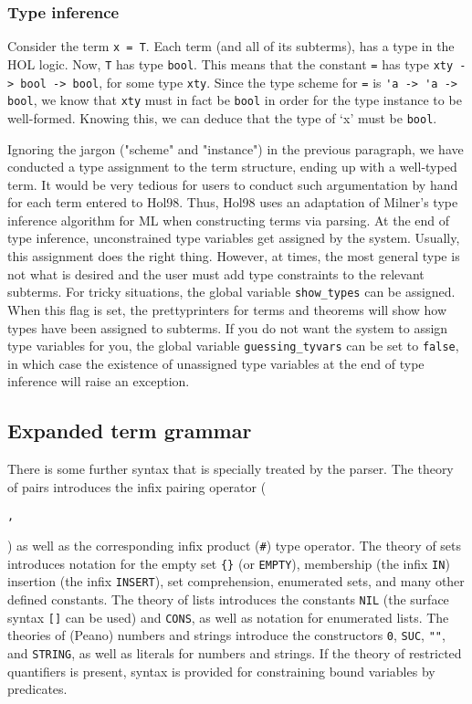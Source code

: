 \documentclass[12pt,fleqn,a4paper]{report}
\begin{document}
\subsubsection{Type inference}

Consider the term \verb+x = T+.  Each term (and all of its subterms),
has a type in the HOL logic. Now, \verb+T+ has type \verb+bool+. This
means that the constant \verb+=+ has type \verb+xty -> bool -> bool+,
for some type \verb+xty+. Since the type scheme for \verb+=+ is
\verb+'a -> 'a -> bool+, we know that \verb+xty+ must in fact be
\verb+bool+ in order for the type instance to be well-formed. Knowing
this, we can deduce that the type of `x' must be \verb+bool+.

Ignoring the jargon ("scheme" and "instance") in the previous
paragraph, we have conducted a type assignment to the term structure,
ending up with a well-typed term. It would be very tedious for users
to conduct such argumentation by hand for each term entered to Hol98.
Thus, Hol98 uses an adaptation of Milner's type inference algorithm
for ML when constructing terms via parsing. At the end of type
inference, unconstrained type variables get assigned by the system.
Usually, this assignment does the right thing. However, at times, the
most general type is not what is desired and the user must add type
constraints to the relevant subterms. For tricky situations, the
global variable \verb+show_types+ can be assigned. When this flag is
set, the prettyprinters for terms and theorems will show how types
have been assigned to subterms. If you do not want the system to
assign type variables for you, the global variable
\verb+guessing_tyvars+ can be set to \verb+false+, in which case the
existence of unassigned type variables at the end of type inference
will raise an exception.

\subsection{Expanded term grammar}

There is some further syntax that is specially treated by the parser.
The theory of pairs introduces the infix pairing operator
(\begin{Large}\verb+,+\end{Large}) as well as the corresponding infix
product (\verb+#+) type operator. The theory of sets introduces
notation for the empty set \verb+{}+ (or \verb+EMPTY+), membership
(the infix \verb+IN+) insertion (the infix \verb+INSERT+), set
comprehension, enumerated sets, and many other defined constants. The
theory of lists introduces the constants \verb+NIL+ (the surface
syntax \verb+[]+ can be used) and \verb+CONS+, as well as notation for
enumerated lists. The theories of (Peano) numbers and strings
introduce the constructors \verb+0+, \verb+SUC+, \verb+""+, and
\verb+STRING+, as well as literals for numbers and strings. If the
theory of restricted quantifiers is present, syntax is provided for
constraining bound variables by predicates.
\end{document}
